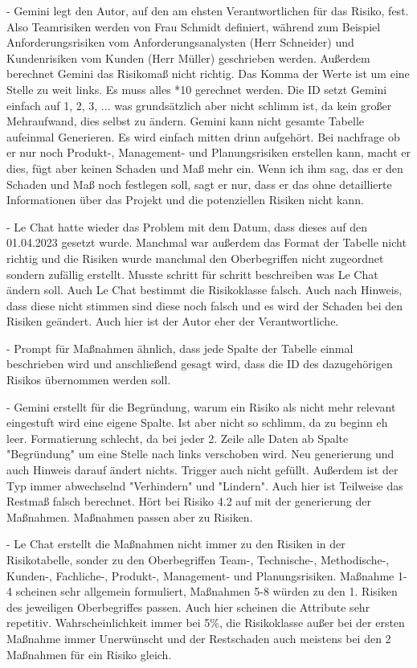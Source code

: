 - Gemini legt den Autor, auf den am ehsten Verantwortlichen für das Risiko, fest. Also Teamrisiken werden von Frau Schmidt definiert,
während zum Beispiel Anforderungsrisiken vom Anforderungsanalysten (Herr Schneider) und Kundenrisiken vom Kunden (Herr Müller) geschrieben
werden. Außerdem berechnet Gemini das Risikomaß nicht richtig. Das Komma der Werte ist um eine Stelle zu weit links. Es muss alles *10 
gerechnet werden. Die ID setzt Gemini einfach auf 1, 2, 3, ... was grundsätzlich aber nicht schlimm ist, da kein großer Mehraufwand, dies 
selbst zu ändern. Gemini kann nicht gesamte Tabelle aufeinmal Generieren. Es wird einfach mitten drinn aufgehört. Bei nachfrage ob er nur 
noch Produkt-, Management- und Planungsrisiken erstellen kann, macht er dies, fügt aber keinen Schaden und Maß mehr ein. Wenn ich ihm sag, 
das er den Schaden und Maß noch festlegen soll, sagt er nur, dass er das ohne detaillierte Informationen über das Projekt und die potenziellen
Risiken nicht kann.

- Le Chat hatte wieder das Problem mit dem Datum, dass dieses auf den 01.04.2023 gesetzt wurde. Manchmal war außerdem das Format der Tabelle 
nicht richtig und die Risiken wurde manchmal den Oberbegriffen nicht zugeordnet sondern zufällig erstellt. Musste schritt für schritt beschreiben 
was Le Chat ändern soll. Auch Le Chat bestimmt die Risikoklasse falsch. Auch nach Hinweis, dass diese nicht stimmen sind diese noch falsch 
und es wird der Schaden bei den Risiken geändert. Auch hier ist der Autor eher der Verantwortliche.


- Prompt für Maßnahmen ähnlich, dass jede Spalte der Tabelle einmal beschrieben wird und anschließend gesagt wird, dass die ID des dazugehörigen
Risikos übernommen werden soll.

- Gemini erstellt für die Begründung, warum ein Risiko als nicht mehr relevant eingestuft wird eine eigene Spalte. Ist aber nicht so schlimm, da 
zu beginn eh leer. Formatierung schlecht, da bei jeder 2. Zeile alle Daten ab Spalte "Begründung" um eine Stelle nach links verschoben wird. Neu 
generierung und auch Hinweis darauf ändert nichts. Trigger auch nicht gefüllt. Außerdem ist der Typ immer abwechselnd "Verhindern" und "Lindern".
Auch hier ist Teilweise das Restmaß falsch berechnet. Hört bei Risiko 4.2 auf mit der generierung der Maßnahmen. Maßnahmen passen aber zu Risiken.

- Le Chat erstellt die Maßnahmen nicht immer zu den Risiken in der Risikotabelle, sonder zu den Oberbegriffen Team-, Technische-, Methodische-, 
Kunden-, Fachliche-, Produkt-, Management- und Planungsrisiken. Maßnahme 1-4 scheinen sehr allgemein formuliert, Maßnahmen 5-8 würden
zu den 1. Risiken des jeweiligen Oberbegriffes passen. Auch hier scheinen die Attribute sehr repetitiv. Wahrscheinlichkeit immer bei 5\%,
die Risikoklasse außer bei der ersten Maßnahme immer Unerwünscht und der Restschaden auch meistens bei den 2 Maßnahmen für ein Risiko gleich.
